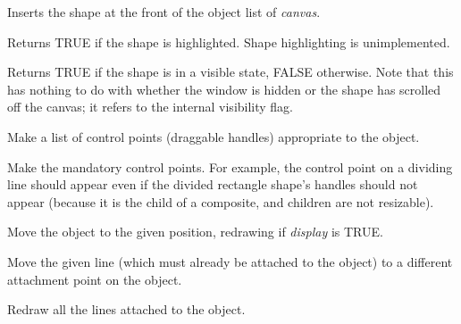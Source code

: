 
Inserts the shape at the front of the object list of {\it canvas}.



Returns TRUE if the shape is highlighted. Shape highlighting is unimplemented.



Returns TRUE if the shape is in a visible state, FALSE otherwise. Note
that this has nothing to do with whether the window is hidden or the
shape has scrolled off the canvas; it refers to the internal
visibility flag.



Make a list of control points (draggable handles) appropriate to the object.



Make the mandatory control points. For example, the control point on a dividing line should
appear even if the divided rectangle shape's handles should not appear (because it is the child of
a composite, and children are not resizable).



Move the object to the given position, redrawing if {\it display} is TRUE.



Move the given line (which must already be attached to the object) to 
a different attachment point on the object.



Redraw all the lines attached to the object.


